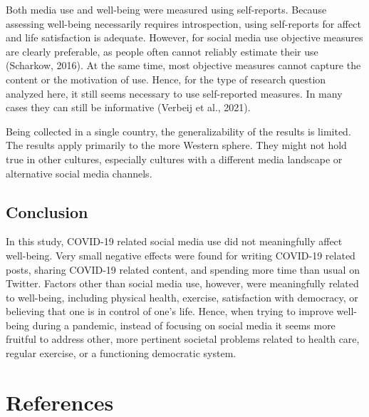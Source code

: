 \documentclass[
  man,floatsintext]{apa7}
\begin{document}
Both media use and well-being were measured using self-reports.
Because assessing well-being necessarily requires introspection, using self-reports for affect and life satisfaction is adequate.
However, for social media use objective measures are clearly preferable, as people often cannot reliably estimate their use (Scharkow, 2016).
At the same time, most objective measures cannot capture the content or the motivation of use.
Hence, for the type of research question analyzed here, it still seems necessary to use self-reported measures.
In many cases they can still be informative (Verbeij et al., 2021).

Being collected in a single country, the generalizability of the results is limited.
The results apply primarily to the more Western sphere.
They might not hold true in other cultures, especially cultures with a different media landscape or alternative social media channels.

\hypertarget{conclusion}{%
\subsection{Conclusion}\label{conclusion}}

In this study, COVID-19 related social media use did not meaningfully affect well-being.
Very small negative effects were found for writing COVID-19 related posts, sharing COVID-19 related content, and spending more time than usual on Twitter.
Factors other than social media use, however, were meaningfully related to well-being, including physical health, exercise, satisfaction with democracy, or believing that one is in control of one's life.
Hence, when trying to improve well-being during a pandemic, instead of focusing on social media it seems more fruitful to address other, more pertinent societal problems related to health care, regular exercise, or a functioning democratic system.

\newpage

\hypertarget{references}{%
\section{References}\label{references}}
\end{document}
